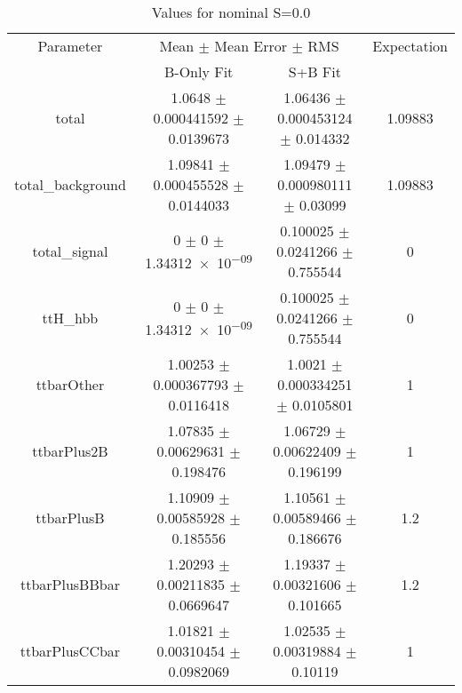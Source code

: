 \begin{table}
\centering
\caption{Values for nominal S=0.0}
\begin{tabular}{cccc}
\toprule
Parameter & \multicolumn{2}{c}{Mean $\pm$ Mean Error $\pm$ RMS} & Expectation\\
 & B-Only Fit & S+B Fit & \\
\midrule
total & \num{1.0648} $\pm$ \num{0.000441592} $\pm$ \num{0.0139673} & \num{1.06436} $\pm$ \num{0.000453124} $\pm$ \num{0.014332} & \num{1.09883}\\
total\_background & \num{1.09841} $\pm$ \num{0.000455528} $\pm$ \num{0.0144033} & \num{1.09479} $\pm$ \num{0.000980111} $\pm$ \num{0.03099} & \num{1.09883}\\
total\_signal & \num{0} $\pm$ \num{0} $\pm$ \num{1.34312e-09} & \num{0.100025} $\pm$ \num{0.0241266} $\pm$ \num{0.755544} & \num{0}\\
ttH\_hbb & \num{0} $\pm$ \num{0} $\pm$ \num{1.34312e-09} & \num{0.100025} $\pm$ \num{0.0241266} $\pm$ \num{0.755544} & \num{0}\\
ttbarOther & \num{1.00253} $\pm$ \num{0.000367793} $\pm$ \num{0.0116418} & \num{1.0021} $\pm$ \num{0.000334251} $\pm$ \num{0.0105801} & \num{1}\\
ttbarPlus2B & \num{1.07835} $\pm$ \num{0.00629631} $\pm$ \num{0.198476} & \num{1.06729} $\pm$ \num{0.00622409} $\pm$ \num{0.196199} & \num{1}\\
ttbarPlusB & \num{1.10909} $\pm$ \num{0.00585928} $\pm$ \num{0.185556} & \num{1.10561} $\pm$ \num{0.00589466} $\pm$ \num{0.186676} & \num{1.2}\\
ttbarPlusBBbar & \num{1.20293} $\pm$ \num{0.00211835} $\pm$ \num{0.0669647} & \num{1.19337} $\pm$ \num{0.00321606} $\pm$ \num{0.101665} & \num{1.2}\\
ttbarPlusCCbar & \num{1.01821} $\pm$ \num{0.00310454} $\pm$ \num{0.0982069} & \num{1.02535} $\pm$ \num{0.00319884} $\pm$ \num{0.10119} & \num{1}\\
\bottomrule
\end{tabular}
\end{table}